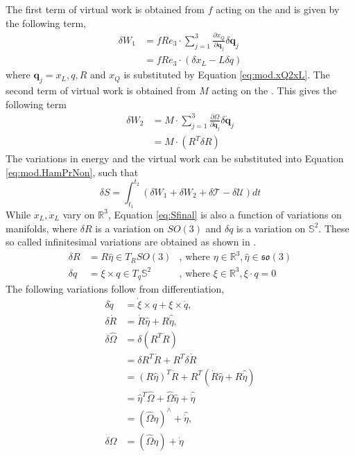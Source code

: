 The first term of virtual work is obtained from $ f $ acting on the  and is given by the following term,
\begin{equation}\label{key}
\begin{aligned}
\delta W_1&=fRe_3\cdot \sum_{j=1}^{3}\frac{\partial x_Q}{\partial \mathbf{q}_j}\delta \mathbf{q}_j\\
&=fRe_3\cdot(\delta x_L-L\delta q)
\end{aligned}
\end{equation}
where $ \mathbf{q}_j={x_L,q,R} $ and $ x_Q $ is substituted by Equation \ref{eq:mod.xQ2xL}.
The second term of virtual work is obtained from $ M $ acting on the . This gives the following term
\begin{equation}\label{key}
\begin{aligned}
\delta W_2&=M\cdot \sum_{j=1}^{3}\frac{\partial\Omega}{\partial \mathbf{\dot{q}}_j}\delta \mathbf{\dot{q}}_j\\
&=M\cdot(R^T\delta R)
\end{aligned}\end{equation}
The variations in energy and the virtual work can be substituted into Equation \ref{eq:mod.HamPrNon}, such that
\begin{equation}\label{eq:Sfinal}
\delta S = \int_{t_1}^{t_2}(\delta W_1+\delta W_2+\delta\mathcal{T}-\delta\mathcal{U})dt
\end{equation}
While $ x_L,\dot{x}_L $ vary on $ \mathbb{R}^3 $, Equation \ref{eq:Sfinal} is also a function of variations on manifolds, where $ \delta R $ is a variation on $ SO(3) $ and $ \delta q $ is a variation on $ \mathbb{S}^2 $. These so called infinitesimal variations are obtained as shown in  \cite{Lee2005,Lee2011,Bullo2005,Sreenath2013c}. 
\begin{equation}\label{eq:mod.varRq}
\begin{aligned}
\delta R&=R\hat{\eta}\in T_RSO(3)&\text{, where } \eta\in\mathbb{R}^3,\hat{\eta}\in\mathfrak{so}(3)\\
\delta q&=\xi\times q \in T_q\mathbb{S}^2&\text{, where }\xi\in\mathbb{R}^3,\xi\cdot q=0
\end{aligned}
\end{equation}
The following variations follow from differentiation,
\begin{equation}\label{eq:mod.var}
\begin{aligned}
\delta \dot{q}&=\dot{\xi}\times q+\xi\times\dot{q},\\
\delta \dot{R}&=\dot{R}\hat{\eta}+R\hat{\dot{\eta}},\\
\delta \hat{\Omega}&=\delta(R^T\dot{R})\\
&=\delta R^T\dot{R}+R^T\delta\dot{R}\\
&=(R\hat{\eta})^T\dot{R}+R^T (\dot{R}\hat{\eta}+R\hat{\dot{\eta}})\\
&=\hat{\eta}^T\hat{\Omega}+\hat{\Omega}\hat{\eta}+\hat{\dot{\eta}}\\
&=({\hat{\Omega}\eta})^\wedge+\hat{\dot{\eta}},\\
\delta\Omega&=({\hat{\Omega}\eta})+{\dot{\eta}}
\end{aligned}
\end{equation}

